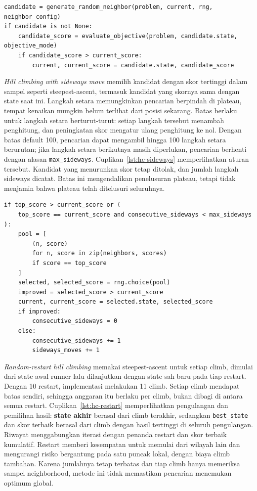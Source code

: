 \documentclass[12pt,a4paper]{article}
\begin{document}
\begin{lstlisting}[emph={candidate,current_score,accepted},caption={Satu neighbor acak per iterasi pada stochastic HC},label={lst:hc-stochastic}]
candidate = generate_random_neighbor(problem, current, rng, neighbor_config)
if candidate is not None:
    candidate_score = evaluate_objective(problem, candidate.state, objective_mode)
    if candidate_score > current_score:
        current, current_score = candidate.state, candidate_score
\end{lstlisting}

\textit{Hill climbing with sideways move} memilih kandidat dengan skor tertinggi dalam sampel seperti steepest-ascent, termasuk kandidat yang skornya sama dengan state saat ini. Langkah setara memungkinkan pencarian berpindah di plateau, tempat kenaikan mungkin belum terlihat dari posisi sekarang. Batas  berlaku untuk langkah setara berturut-turut: setiap langkah tersebut menambah penghitung, dan peningkatan skor mengatur ulang penghitung ke nol. Dengan batas default 100, pencarian dapat mengambil hingga 100 langkah setara berurutan; jika langkah setara berikutnya masih diperlukan, pencarian berhenti dengan alasan \texttt{max\_sideways}. Cuplikan~\ref{lst:hc-sideways} memperlihatkan aturan tersebut. Kandidat yang menurunkan skor tetap ditolak, dan jumlah langkah sideways dicatat. Batas ini mengendalikan penelusuran plateau, tetapi tidak menjamin bahwa plateau telah ditelusuri seluruhnya.

\begin{lstlisting}[emph={top_score,max_sideways,consecutive_sideways,improved},caption={Penerimaan dan penghitungan sideways move},label={lst:hc-sideways}]
if top_score > current_score or (
    top_score == current_score and consecutive_sideways < max_sideways
):
    pool = [
        (n, score)
        for n, score in zip(neighbors, scores)
        if score == top_score
    ]
    selected, selected_score = rng.choice(pool)
    improved = selected_score > current_score
    current, current_score = selected.state, selected_score
    if improved:
        consecutive_sideways = 0
    else:
        consecutive_sideways += 1
        sideways_moves += 1
\end{lstlisting}

\textit{Random-restart hill climbing} memakai steepest-ascent untuk setiap climb, dimulai dari state awal runner lalu dilanjutkan dengan state sah baru pada tiap restart. Dengan 10 restart, implementasi melakukan 11 climb. Setiap climb mendapat batas  sendiri, sehingga anggaran itu berlaku per climb, bukan dibagi di antara semua restart. Cuplikan~\ref{lst:hc-restart} memperlihatkan pengulangan dan pemilihan hasil: \textbf{state akhir} berasal dari climb terakhir, sedangkan \texttt{best\_state} dan skor terbaik berasal dari climb dengan hasil tertinggi di seluruh pengulangan. Riwayat menggabungkan iterasi dengan penanda restart dan skor terbaik kumulatif. Restart memberi kesempatan untuk memulai dari wilayah lain dan mengurangi risiko bergantung pada satu puncak lokal, dengan biaya climb tambahan. Karena jumlahnya tetap terbatas dan tiap climb hanya memeriksa sampel neighborhood, metode ini tidak memastikan pencarian menemukan optimum global.
\end{document}
